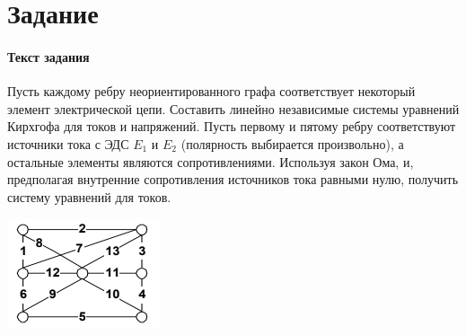 \documentclass[a4paper, 12pt]{article}
\newcommand{\RNum}[1]{\uppercase\expandafter{\romannumeral #1\relax}}
\begin{document}
\section*{Задание \RNum{6}} 
\paragraph{Текст задания} Пусть каждому ребру неориентированного графа соответствует некоторый элемент
электрической цепи. Составить линейно независимые системы уравнений Кирхгофа для токов и
напряжений. Пусть первому и пятому ребру соответствуют источники тока с ЭДС
$E_1$ и $E_2$ (полярность выбирается произвольно), а остальные элементы являются сопротивлениями. Используя
закон Ома, и, предполагая внутренние сопротивления источников тока равными нулю, получить
систему уравнений для токов.

\includegraphics{6_chain}
\end{document}
